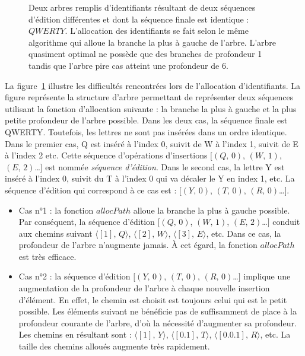 \begin{figure}
  \centering
  \hspace{40pt}
  \caption{\label{fig:allocpathexample} Deux arbres remplis d'identifiants
    résultant de deux séquences d'édition différentes et dont la séquence finale
    est identique : $QWERTY$. L'allocation des identifiants se fait selon le
    même algorithme qui alloue la branche la plus à gauche de l'arbre. L'arbre
    quasiment optimal ne possède que des branches de profondeur 1 tandis que
    l'arbre pire cas atteint une profondeur de 6.}
\end{figure}

La figure~\ref{fig:allocpathexample} illustre les difficultés rencontrées lors
de l'allocation d'identifiants. La figure représente la structure d'arbre
permettant de représenter deux séquences utilisant la fonction d'allocation
suivante : la branche la plus à gauche et la plus petite profondeur de l'arbre
possible. Dans les deux cas, la séquence finale est QWERTY. Toutefois, les
lettres ne sont pas insérées dans un ordre identique. Dans le premier cas, Q est
inséré à l'index 0, suivit de W à l'index 1, suivit de E à l'index 2 etc. Cette
séquence d'opérations d'insertions $[(Q,\,0)$, $(W,\,1)$, $(E,\,2)$\ldots$]$ est
nommée \emph{séquence d'édition}. Dans le second cas, la lettre Y est inséré à
l'index 0, suivit du T à l'index 0 qui va décaler le Y en index 1, etc. La
séquence d'édition qui correspond à ce cas est : $[(Y,\,0)$, $(T,\,0)$,
$(R,\,0)$\ldots$]$.
\begin{itemize}
\item Cas n°1 : la fonction $allocPath$ alloue la branche la plus à gauche
  possible. Par conséquent, la séquence d'édition $[(Q,\,0)$, $(W,\,1)$,
  $(E,\,2)$\ldots$]$ conduit aux chemins suivant $\langle [1],\,Q\rangle$,
  $\langle [2],\, W \rangle$, $\langle [3],\, E\rangle$, etc. Dans ce cas, la
  profondeur de l'arbre n'augmente jamais. À cet égard, la fonction $allocPath$
  est très efficace.
\item Cas n°2 : la séquence d'édition $[(Y,\,0)$, $(T,\,0)$, $(R,\,0)$\ldots$]$
  implique une augmentation de la profondeur de l'arbre à chaque nouvelle
  insertion d'élément. En effet, le chemin est choisit est toujours celui qui
  est le petit possible. Les éléments suivant ne bénéficie pas de suffisamment de
  place à la profondeur courante de l'arbre, d'où la nécessité d'augmenter sa
  profondeur. Les chemins en résultant sont : $\langle [1],\, Y\rangle$,
  $\langle[0.1],\,T\rangle$, $\langle[0.0.1],\, R\rangle$, etc. La taille des
  chemins alloués augmente très rapidement.
\end{itemize}

